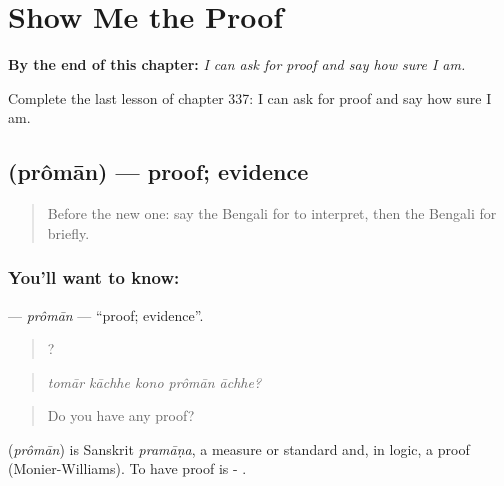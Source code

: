 
\chapter{Show Me the Proof}
\label{ch:bn-show-me-the-proof}

\begin{chapteropening}
\textbf{By the end of this chapter:} \emph{I can ask for proof and say how sure I am.}

Complete the last lesson of chapter 337: I can ask for proof and say how sure I am.
\end{chapteropening}

\section[\texorpdfstring{\bn{প্রমাণ} (prômān)}{প্রমাণ (prômān)}]{ (prômān) — proof; evidence}

\label{lesson:BN-C337-proman}



\begin{quote}
Before the new one: say the Bengali for to interpret, then the Bengali for briefly.
\end{quote}

\subsection*{You'll want to know: }
\textbf{} — \emph{prômān} — \textquotedblleft{}proof; evidence\textquotedblright{}.

\begin{quote}
    ?
\end{quote}

\begin{quote}
\emph{tomār kāchhe kono prômān āchhe?}
\end{quote}

\begin{quote}
Do you have any proof?
\end{quote}

\begin{cousinweb}
\textbf{} (\emph{prômān}) is Sanskrit \emph{pramāṇa}, a measure or standard and, in logic, a proof (Monier-Williams). To have proof is -   .
\end{cousinweb}


